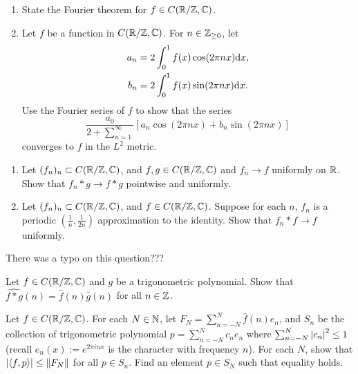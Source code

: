 \documentclass{article}
\begin{document}
\bigskip
\begin{prob}
    \begin{enumerate}[label=(\alph*)]
        \item State the Fourier theorem for $f \in C(\mathbb{R}/\mathbb{Z},\mathbb{C})$.
        \item Let $f$ be a function in $C(\mathbb{R}/\mathbb{Z},\mathbb{C})$. For $n \in \mathbb{Z}_{\geq 0}$, let \begin{align*}
                a_n &= 2 \int_0^1 f(x) \cos(2\pi nx) \mathrm{d} x, \\
                b_n &= 2 \int_0^1 f(x) \sin(2\pi nx) \mathrm{d} x.
        \end{align*}
        Use the Fourier series of $f$ to show that the series
        \[ \frac{a_0}{2 + \sum_{n=1}^\infty} \left[ a_n \cos(2\pi nx) + b_n \sin(2\pi nx) \right] \]
        converges to $f$ in the $L^2$ metric.
    \end{enumerate}
\end{prob}

\bigskip
\begin{prob}
    \begin{enumerate}[label=(\alph*)]
        \item Let $(f_n)_n \subset C(\mathbb{R}/\mathbb{Z}, \mathbb{C})$, and $f,g \in C(\mathbb{R}/\mathbb{Z},\mathbb{C})$ and $f_n \rightarrow f$ uniformly on $\mathbb{R}$. Show that $f_n * g \rightarrow f*g$ pointwise and uniformly.
        \item Let $(f_n)_n \subset C(\mathbb{R}/\mathbb{Z}, \mathbb{C})$, and $f \in C(\mathbb{R}/\mathbb{Z},\mathbb{C})$. Suppose for each $n$, $f_n$ is a periodic $ \left( \frac{1}{n}, \frac{1}{2n} \right) $ approximation to the identity. Show that $f_n * f \rightarrow f$ uniformly.
    \end{enumerate}
\end{prob}
There was a typo on this question???

\bigskip
\begin{prob}
    Let $f \in C(\mathbb{R}/\mathbb{Z},\mathbb{C})$ and $g$ be a trigonometric polynomial. Show that $\hat{f * g}(n) = \hat{f}(n)\hat{g}(n)$ for all $n \in \mathbb{Z}$.
\end{prob}

\bigskip
\begin{prob}
    Let $f \in C(\mathbb{R}/\mathbb{Z}, \mathbb{C})$. For each $N \in \mathbb{N}$, let $F_N = \sum_{n=-N}^N \hat{f}(n) e_n$, and $S_n$ be the collection of trigonometric polynomial $p = \sum_{n=-N}^N c_n e_n$ where $\sum_{n=-N}^N \left\lvert c_n \right\rvert^2 \leq 1$ (recall $e_n(x) := e^{2\pi i n x}$ is the character with frequency $n$). For each $N$, show that $\left\lvert \left\langle f,p \right\rangle \right\rvert \leq \left\lVert F_N\right\rVert$ for all $p \in S_n$. Find an element $p \in S_N$ such that equality holds.
\end{prob}
\end{document}
